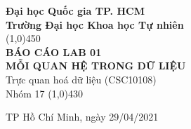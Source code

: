 \documentclass[a4paper, 12pt]{article}
\begin{document}
    \begin{titlepage}
        \begin{center}

            \vspace*{1cm}
            \Large\textbf{Đại học Quốc gia TP. HCM\\Trường Đại học Khoa học Tự nhiên}\\

            \vfill
            \line(1,0){450}\\[4mm]
            \LARGE\textbf{\MakeUppercase{Báo cáo Lab 01\\ Mỗi quan hệ trong dữ liệu}}\\[3mm]
            \Large{Trực quan hoá dữ liệu (CSC10108)}\\[3mm]
            \Large{Nhóm 17}
            \line(1,0){430}\\
            \vfill

            \vfill
            TP Hồ Chí Minh, ngày 29/04/2021
        \end{center}
    \end{titlepage}

    \tableofcontents
    \thispagestyle{empty}
    \clearpage
\end{document}
